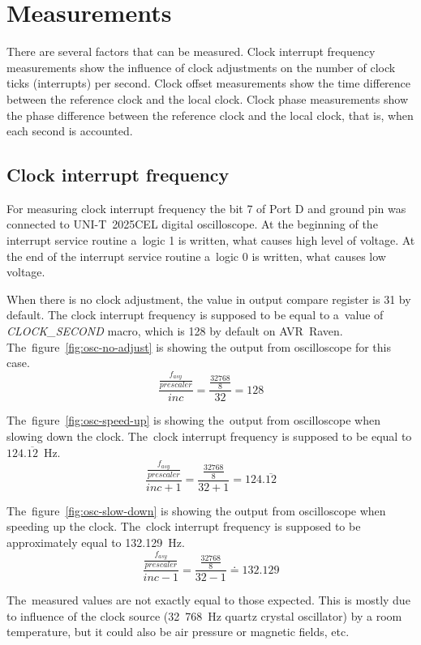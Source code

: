 
\chapter{Measurements}\label{chap:measurements}
There are several factors that can be measured.
Clock interrupt frequency measurements show the influence of clock adjustments
on the number of clock ticks (interrupts) per second.
Clock offset measurements show the time difference between the reference clock and
the local clock.
Clock phase measurements show the phase difference between the reference clock and
the local clock, that is, when each second is accounted.

\section{Clock interrupt frequency}
For measuring clock interrupt frequency the bit 7 of Port D
and ground pin was connected to UNI-T~2025CEL digital oscilloscope.
At the beginning of the interrupt service routine a~logic 1 is written,
what causes high level of voltage.
At the end of the interrupt service routine a~logic 0 is written,
what causes low voltage.

When there is no clock adjustment, the value in output compare register is 31 by default.
The clock interrupt frequency
is supposed to be equal to a~value of {\it{CLOCK\_SECOND}} macro, which is 128 by default on AVR~Raven.
The~figure~\ref{fig:osc-no-adjust} is showing the output from oscilloscope
for this case.
$$\frac{\frac{f_{asy}}{prescaler}}{inc} = \frac{\frac{32768}{8}}{32} = 128$$

The~figure~\ref{fig:osc-speed-up} is showing the~output from oscilloscope
when slowing down the clock.
The~clock interrupt frequency
is supposed to be equal to $124.\overline{12}$~Hz.
$$\frac{\frac{f_{asy}}{prescaler}}{inc + 1} = \frac{\frac{32768}{8}}{32+1} = 124.\overline{12}$$

The~figure~\ref{fig:osc-slow-down} is showing the output from oscilloscope
when speeding up the clock.
The~clock interrupt frequency
is supposed to be approximately equal to 132.129~Hz.
$$\frac{\frac{f_{asy}}{prescaler}}{inc - 1} = \frac{\frac{32768}{8}}{32-1} \doteq 132.129$$


The~measured values are not exactly equal to those expected.
This is mostly due to influence of the clock source
(32~768~Hz quartz crystal oscillator) by a room temperature,
but it could also be air pressure or magnetic fields, etc.


